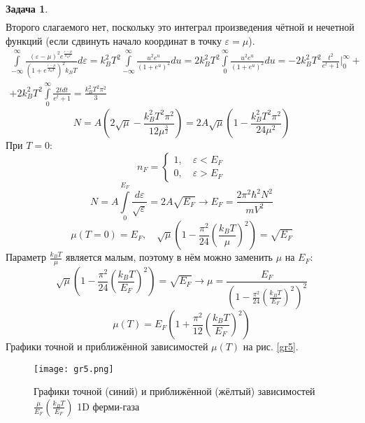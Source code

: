 \documentclass[12pt]{article}
\theoremstyle{definition}
\newtheorem{zad}{Задача}[section]
\begin{document}
\begin{zad}
\begin{multline}
\end{multline}
Второго слагаемого нет, поскольку это интеграл произведения чётной и нечетной функций (если сдвинуть начало координат в точку $\varepsilon=\mu$).
\begin{multline}
    \int\limits_{-\infty}^\infty\frac{(\varepsilon-\mu)^2e^{\frac{\varepsilon-\mu}{k_BT}}}{\left(1+e^{\frac{\varepsilon-\mu}{k_BT}}\right)^2k_BT}d\varepsilon=k_B^2T^2\int\limits_{-\infty}^\infty\frac{u^2e^u}{\left(1+e^u\right)^2}du=2k_B^2T^2\int\limits_{0}^\infty\frac{u^2e^u}{\left(1+e^u\right)^2}du=-2k_B^2T^2\frac{t^2}{e^t+1}\bigg|_0^\infty+\\+2k_B^2T^2\int\limits_0^\infty\frac{2tdt}{e^t+1}=\frac{k_B^2T^2\pi^2}{3}
\end{multline}
\begin{equation}
    N=A\left(2\sqrt{\mu}-\frac{k_B^2T^2\pi^2}{12\mu^\frac{3}{2}}\right)=2A\sqrt{\mu}\left(1-\frac{k_B^2T^2\pi^2}{24\mu^2}\right)
\end{equation}
При $T=0$:
\begin{equation}
    n_F=\begin{cases}
    1,\quad \varepsilon<E_F\\
    0,\quad \varepsilon>E_F
    \end{cases}
\end{equation}
\begin{equation}
    N=A\int\limits_0^{E_F}\frac{d\varepsilon}{\sqrt{\varepsilon}}=2A\sqrt{E_F}\rightarrow E_F=\frac{2\pi^2\hbar^2N^2}{mV^2}
\end{equation}
\begin{equation}
    \mu(T=0)=E_F,\quad \sqrt{\mu}\left(1-\frac{\pi^2}{24}\left(\frac{k_BT}{\mu}\right)^2\right)=\sqrt{E_F}
\end{equation}
Параметр $\frac{k_BT}{\mu}$ является малым, поэтому в нём можно заменить $\mu$ на $E_F$:
\begin{equation}
    \sqrt{\mu}\left(1-\frac{\pi^2}{24}\left(\frac{k_BT}{E_F}\right)^2\right)=\sqrt{E_F}\rightarrow\mu=\frac{E_F}{\left(1-\frac{\pi^2}{24}\left(\frac{k_BT}{E_F}\right)^2\right)^2}
\end{equation}
\begin{equation}
    \boxed{\mu(T)=E_F\left(1+\frac{\pi^2}{12}\left(\frac{k_BT}{E_F}\right)^2\right)}
\end{equation}
Графики точной и приближённой зависимостей $\mu(T)$ на рис. \ref{gr5}.
\begin{figure}
    \centering
    \texttt{[image: gr5.png]}
    \caption{Графики точной (синий) и приближённой (жёлтый) зависимостей $\frac{\mu}{E_F}\left(\frac{k_BT}{E_F}\right)$ 1D ферми-газа}

\end{figure}
\end{zad}
\end{document}
